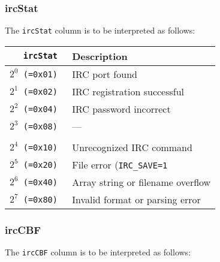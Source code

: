 \documentclass[documentation]{subfiles}
\begin{document}
\subsubsection{ircStat}\label{ircStat}
The {\tt ircStat} column is to be interpreted as follows:
\begin{longtable}{>{\tt}rl}
    \toprule
    {\bf ircStat} & {\bf Description}\\
    \midrule\endhead%
    $2^0$ (=0x01) & IRC port found\\
    $2^1$ (=0x02) & IRC registration successful\\
    $2^2$ (=0x04) & IRC password incorrect\\
    $2^3$ (=0x08) & ---\\
    \\
    $2^4$ (=0x10) & Unrecognized IRC command\\
    $2^5$ (=0x20) & File error ({\tt IRC\_SAVE=1}\\
    $2^6$ (=0x40) & Array string or filename overflow\\
    $2^7$ (=0x80) & Invalid format or parsing error\\
    \bottomrule
\end{longtable}

\clearpage

\subsubsection{ircCBF}\label{ircCBF}
The {\tt ircCBF} column is to be interpreted as follows:
\end{document}
